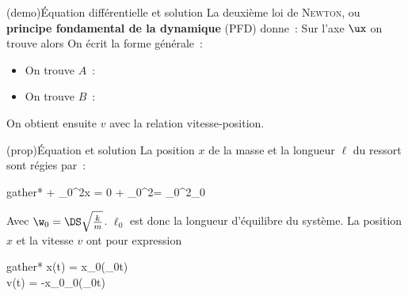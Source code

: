 \documentclass[../../main/main.tex]{subfiles}
\begin{document}
\begin{tcb}[label=demo:solreslibre, sidebyside](demo){Équation différentielle et solution}
	La deuxième loi de \textsc{Newton}, ou \textbf{principe fondamental de la
		dynamique} (PFD) donne~:
	Sur l'axe $\ux$ on trouve alors
	\psw{
		\[
			m \dv[2]{x}{t} + kx = 0 \Lra \boxed{\dv[2]{x}{t} + \w_0{}^{2}x = 0}
		\]
	}
	\tcblower
	On écrit la forme générale~:
	\psw{
		\[
			x(t) = A\cos(\w_0 t) + B\sin(\w_0 t)
		\]
	}
	\vspace{-15pt}
	\begin{itemize}
		\item On trouve $A$~:
		      \psw{
			      \[
				      x(0) = A\cos(0) + B\sin(0) = A
				      \qet
				      x(0) = x_0
				      \quad \Ra \boxed{A = x_0}
			      \]
		      }
		      \vspace{-15pt}
		\item On trouve $B$~:
		      \vspace{-15pt}
	\end{itemize}
	On obtient ensuite $v$ avec la relation vitesse-position.
\end{tcb}
\begin{tcb}[label=prop:eqdiffreslibre, sidebyside](prop){Équation et solution}
	La position $x$ de la masse et la longueur $\ell$ du ressort sont régies
	par~:

	\begin{empheq}[box=\fbox]{gather*}
		 + \w_0{}^2x = 0
		\Lra {} + \w_0{}^2\ell = \w_0{}^2\ell_0
	\end{empheq}

	Avec $\w_0 = \DS \sqrt{\frac{k}{m}}$. $\ell_0$ est donc la longueur
	d'équilibre du système.
	\tcblower
	La position $x$ et la vitesse $v$ ont pour expression
	\begin{empheq}[box=\fbox]{gather*}
		x(t) = x_0\cos(\w_0t)\\
		v(t) = -x_0\w_0\sin(\w_0t)
	\end{empheq}
\end{tcb}
\end{document}

